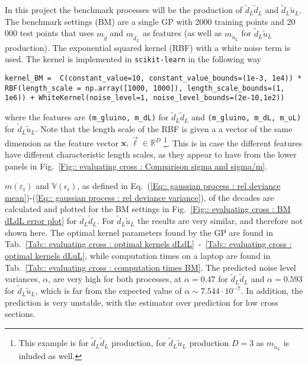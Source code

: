 \documentclass[twoside,english]{uiofysmaster}
\begin{document}
In this project the benchmark processes will be the production of $\tilde{d}_L \tilde{d}_L$ and $\tilde{d}_L \tilde{u}_L$. The benchmark settings (BM) are a single GP with 2000 training points and 20 000 test points that uses $m_{\tilde{g}}$ and $m_{\tilde{d}_L}$ as features (as well as $m_{\tilde{u}_L}$ for $\tilde{d}_L \tilde{u}_L$ production). The exponential squared kernel (RBF) with a white noise term is used. The kernel is implemented in \verb|scikit-learn| in the following way 
\begin{lstlisting}
kernel_BM =  C(constant_value=10, constant_value_bounds=(1e-3, 1e4)) * RBF(length_scale = np.array([1000, 1000]), length_scale_bounds=(1, 1e6)) + WhiteKernel(noise_level=1, noise_level_bounds=(2e-10,1e2))
\end{lstlisting} 
where the features are \verb|(m_gluino, m_dL)| for $\tilde{d}_L \tilde{d}_L$ and \verb|(m_gluino, m_dL, m_uL)| for $\tilde{d}_L \tilde{u}_L$. Note that the length scale of the RBF is given a a vector of the same dimension as the feature vector $\textbf{x},\vec{\ell} \in \mathbb{R}^D$ \footnote{This example is for $\tilde{d}_L \tilde{d}_L$ production, for $\tilde{d}_L \tilde{u}_L$ production $D=3$ as $m_{\tilde{u}_L}$ is inluded as well.}. This is in case the different features have different characteristic length scales, as they appear to have from the lower panels in Fig.~\ref{Fig:: evaluating cross : Comparison sigma and sigma/m}. 

$m(\varepsilon_i)$ and $\mathbb{V}(\epsilon_i)$, as defined in Eq.~(\ref{Eq:: gaussian process : rel deviance mean})-(\ref{Eq:: gaussian process : rel deviance variance}), of the decades are calculated  and plotted for the BM settings in Fig.~\ref{Fig:: evaluating cross : BM dLdL error plot} for $\tilde{d}_L \tilde{d}_L$. For $\tilde{d}_L \tilde{u}_L$  the results are very similar, and therefore not shown here. The optimal kernel parameters  found by the GP are found in Tab.\ \ref{Tab:: evaluating cross : optimal kernels dLdL}~-~\ref{Tab:: evaluating cross : optimal kernels dLuL}, while computation times on a laptop are found in Tab.\ \ref{Tab:: evaluating cross : computation times BM}. The predicted noise level variances, $\alpha$, are very high for both processes, at $\alpha=0.47$ for $\tilde{d}_L \tilde{d}_L$ and $\alpha=0.593$ for $\tilde{d}_L \tilde{u}_L$, which is far from the expected value of $\alpha \sim 7.544 \cdot 10^{-7}$. In addition, the prediction is very unstable, with the estimator over prediction for low cross sections.
\end{document}
